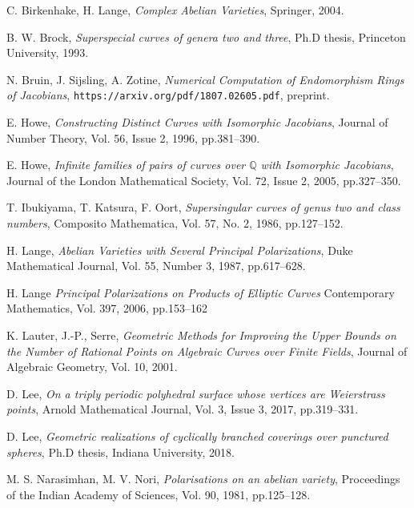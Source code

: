 \documentclass[12pt,reqno]{amsart}
\newcommand{\Q}{\mathbb{Q}}
\theoremstyle{definition}
\theoremstyle{remark}
\begin{document}
\begin{thebibliography}{20}
C. Birkenhake, H. Lange, 
\textit{Complex Abelian Varieties},
Springer, 2004.

B. W. Brock,
\textit{Superspecial curves of genera two and three},
Ph.D thesis, Princeton University, 1993.

N. Bruin, J. Sijsling, A. Zotine,
\textit{Numerical Computation of Endomorphism Rings of Jacobians},
\texttt{https://arxiv.org/pdf/1807.02605.pdf}, preprint.

E. Howe,
\textit{Constructing Distinct Curves with Isomorphic Jacobians},
Journal of Number Theory,
Vol. 56, Issue 2, 1996, pp.381--390.

E. Howe,
\textit{Infinite families of pairs of curves over $\Q$ with Isomorphic Jacobians},
Journal of the London Mathematical Society,
Vol. 72, Issue 2, 2005, pp.327--350.

T. Ibukiyama, T. Katsura, F. Oort,
\textit{Supersingular curves of genus two and class numbers},
Composito Mathematica,
Vol. 57, No. 2, 1986, pp.127--152.

H. Lange,
\textit{Abelian Varieties with Several Principal Polarizations},
Duke Mathematical Journal,
Vol. 55, Number 3, 1987, pp.617--628.

H. Lange
\textit{Principal Polarizations on Products of Elliptic Curves}
Contemporary Mathematics, Vol. 397, 2006, pp.153--162

K. Lauter, J.-P., Serre, 
\textit{Geometric Methods for Improving the Upper Bounds on the Number of Rational Points on Algebraic Curves over Finite Fields}, 
Journal of Algebraic Geometry,
Vol. 10, 2001.

D. Lee,
\textit{On a triply periodic polyhedral surface whose vertices are Weierstrass points},
Arnold Mathematical Journal, 
Vol. 3, Issue 3, 2017, pp.319--331.

D. Lee, 
\textit{Geometric realizations of cyclically branched coverings over punctured spheres}, 
Ph.D thesis, Indiana University, 2018.

M. S. Narasimhan, M. V. Nori,
\textit{Polarisations on an abelian variety},
Proceedings of the Indian Academy of Sciences,
Vol. 90, 1981, pp.125--128.

\end{thebibliography}
\end{document}
